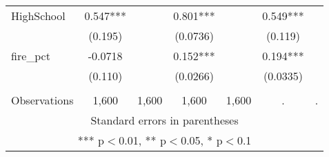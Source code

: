 \begin{tabular}{lcccccc}
HighSchool & 0.547*** &  & 0.801*** &  & 0.549*** &  \\
 & (0.195) &  & (0.0736) &  & (0.119) &  \\
fire\_pct & -0.0718 &  & 0.152*** &  & 0.194*** &  \\
 & (0.110) &  & (0.0266) &  & (0.0335) &  \\
 &  &  &  &  &  &  \\
 Observations & 1,600 & 1,600 & 1,600 & 1,600 & . & . \\ \hline
\multicolumn{7}{c}{ Standard errors in parentheses} \\
\multicolumn{7}{c}{ *** p$<$0.01, ** p$<$0.05, * p$<$0.1} \\
\end{tabular}
